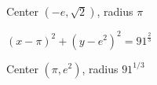 \documentclass{ximera}
\begin{document}
\begin{question}
\begin{problem}
\begin{solution}
Center $(-e, \sqrt{2})$, radius $\pi$ \\

\begin{center} 
\end{center}
\end{solution}
\end{problem}

\begin{problem}\label{circleeqnlast}
$\left(x - \pi \right)^{2} + \left(y -  e^{2}\right)^{2} = 91^{\frac{2}{3}}$

\begin{solution}
Center $(\pi, e^2)$, radius $91^{1/3}$ \\

\begin{center} 
\end{center}
\end{solution}
\end{problem}
\end{question}
\end{document}
